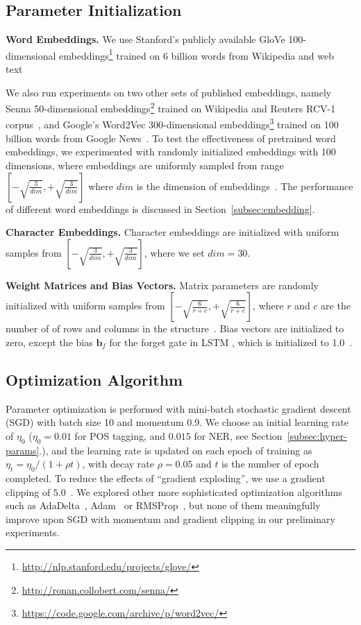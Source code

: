 \documentclass[11pt]{article}
\begin{document}
\subsection{Parameter Initialization}
\label{subsec:init}
\textbf{Word Embeddings.} We use Stanford's publicly available GloVe 100-dimensional embeddings\footnote{\url{http://nlp.stanford.edu/projects/glove/}} trained on 6 billion words from Wikipedia and web text~\cite{pennington:EMNLP2014}

We also run experiments on two other sets of published embeddings, namely Senna 50-dimensional embeddings\footnote{\url{http://ronan.collobert.com/senna/}} trained on Wikipedia and Reuters RCV-1 corpus~\cite{collobert2011natural}, and Google's Word2Vec 300-dimensional embeddings\footnote{\url{https://code.google.com/archive/p/word2vec/}} trained on 100 billion words from Google News~\cite{mikolov2013}. To test the effectiveness of pretrained word embeddings, we experimented with randomly initialized embeddings with 100 dimensions, where embeddings are uniformly sampled from range $[-\sqrt{\frac{3}{dim}}, +\sqrt{\frac{3}{dim}}]$ where $dim$ is the dimension of embeddings~\cite{he2015delving}. The performance of different word embeddings is discussed in Section~\ref{subsec:embedding}.

\noindent
\textbf{Character Embeddings.} Character embeddings are initialized with uniform samples from $[-\sqrt{\frac{3}{dim}}, +\sqrt{\frac{3}{dim}}]$, where we set $dim=30$.

\noindent
\textbf{Weight Matrices and Bias Vectors.} Matrix parameters are randomly initialized with uniform samples from $[-\sqrt{\frac{6}{r + c}}, +\sqrt{\frac{6}{r + c}}]$, where $r$ and $c$ are the number of of rows and columns in the structure~\cite{glorot2010}. Bias vectors are initialized to zero, except the bias $\mathbf{b}_f$ for the forget gate in LSTM , which is initialized to 1.0~\cite{jozefowicz2015}.

\subsection{Optimization Algorithm}
Parameter optimization is performed with mini-batch stochastic gradient descent (SGD) with batch size 10 and momentum 0.9.
We choose an initial learning rate of $\eta_0$ ($\eta_0 = 0.01$ for POS tagging, and $0.015$ for NER, see Section~\ref{subsec:hyper-params}.), and the learning rate is updated on each epoch of training as $\eta_t = \eta_0/(1 + \rho t)$, with decay rate $\rho = 0.05$ and $t$ is the number of epoch completed. To reduce the effects of ``gradient exploding'', we use a gradient clipping of $5.0$~\cite{pascanu2012}. We explored other more sophisticated optimization algorithms such as AdaDelta~\cite{zeiler2012adadelta}, Adam~\cite{kingma2014adam} or RMSProp~\cite{dauphin2015rmsprop}, but none of them meaningfully improve upon SGD with momentum and gradient clipping in our preliminary experiments.
\end{document}
